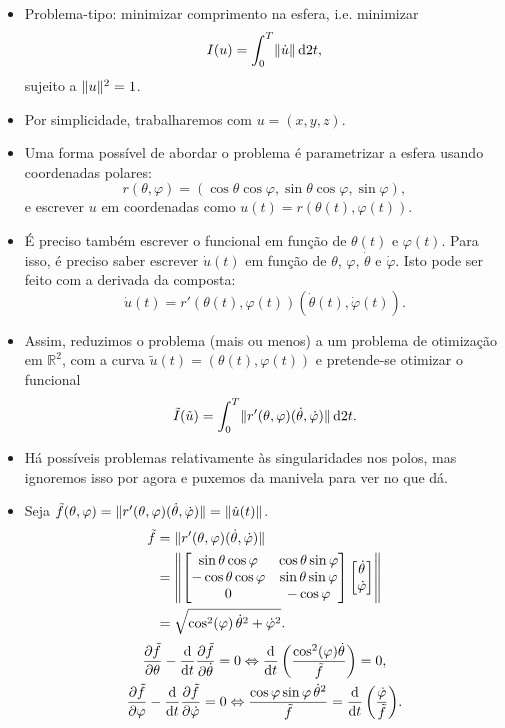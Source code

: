 \documentclass{article}
\theoremstyle{plain}
\theoremstyle{plain}
\theoremstyle{nonumberplain}
\theoremstyle{empty}
\newcommand{\R}{\mathbb{R}}
\DeclarePairedDelimiter\norm{\lVert}{\rVert}
\begin{document}
\begin{itemize}
\item Problema-tipo: minimizar comprimento na esfera, i.e. minimizar
\[I(u) = \int_0^T \norm{\dot u} \dl2 t,\]
sujeito a $\norm{u}^2 = 1$.

\item Por simplicidade, trabalharemos com $u = (x, y, z)$.

\item Uma forma possível de abordar o problema é parametrizar a esfera usando coordenadas polares:
\[r(\theta,\varphi) = (\cos \theta \cos \varphi, \sin \theta \cos \varphi, \sin \varphi),\]
e escrever $u$ em coordenadas como $u(t) = r(\theta(t), \varphi(t))$.

\item É preciso também escrever o funcional em função de $\theta(t)$ e $\varphi(t)$. Para isso, é preciso saber escrever $\dot u(t)$ em função de $\theta$, $\varphi$, $\dot \theta$ e $\dot \varphi$. Isto pode ser feito com a derivada da composta:
\[\dot u(t) = r'(\theta(t),\varphi(t)) (\dot \theta(t), \dot \varphi(t)).\]

\item Assim, reduzimos o problema (mais ou menos) a um problema de otimização em $\R^2$, com a curva $\tilde u(t) = (\theta(t), \varphi(t))$ e pretende-se otimizar o funcional
\[\tilde I(\tilde u) = \int_0^T \norm{ r'(\theta,\varphi)(\dot \theta, \dot \varphi) } \dl2 t.\]

\item Há possíveis problemas relativamente às singularidades nos polos, mas ignoremos isso por agora e puxemos da manivela para ver no que dá.

\item Seja $\tilde f(\theta, \varphi) = \norm{r'(\theta, \varphi) (\dot \theta, \dot \varphi)} = \norm{\dot u(t)}$.
\begin{align*}
\tilde f &= \norm{r'(\theta, \varphi) (\dot \theta, \dot \varphi)}\\
&= \norm*{\begin{bmatrix}
\sin\theta \cos\varphi & \cos\theta \sin\varphi\\
-\cos\theta \cos\varphi & \sin\theta \sin\varphi\\
0 & -\cos\varphi
\end{bmatrix}
\begin{bmatrix}
\dot\theta\\
\dot\varphi
\end{bmatrix}
}\\
&= \sqrt{\cos^2(\varphi) \, \dot\theta^2 + \dot\varphi^2}.
\end{align*}
\begin{gather*}
\diffp{\tilde f} \theta - \diff*{\diffp{\tilde f}{\dot \theta}}t = 0 \Leftrightarrow \diff*{\left( \frac{\cos^2(\varphi) \dot \theta}{\tilde f} \right)}t = 0,\\
\diffp{\tilde f} \varphi - \diff*{\diffp{\tilde f}{\dot \varphi}}t = 0
\Leftrightarrow
\frac{\cos\varphi \sin\varphi \,\dot \theta^2}{\tilde f} = \diff*{\left( \frac{\dot \varphi}{\tilde f} \right)}t.
\end{gather*}


\end{itemize}
\end{document}
